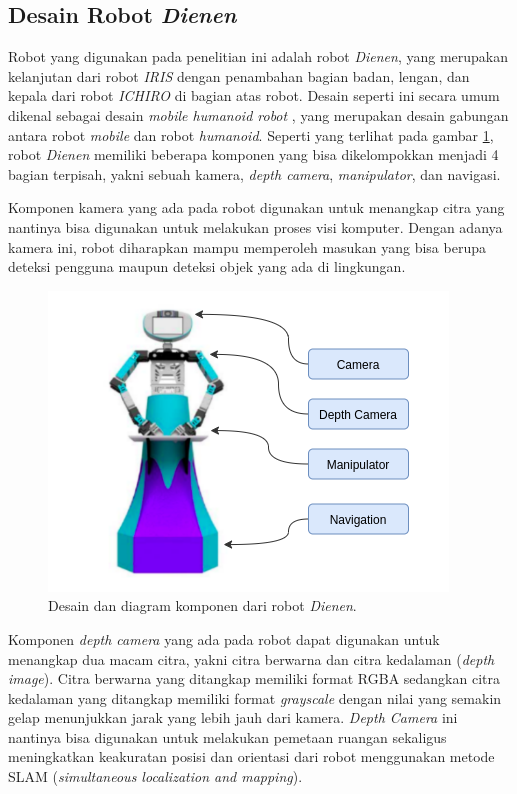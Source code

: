 \subsection{Desain Robot \emph{Dienen}}
\label{subsec:desainrobotdienen}

Robot yang digunakan pada penelitian ini adalah robot \emph{Dienen},
  yang merupakan kelanjutan dari robot \emph{IRIS} \citep{cit:dikairono2020}\citep{cit:zanuar2019} dengan penambahan bagian badan, lengan, dan kepala dari robot \emph{ICHIRO} \citep{cit:muhtadin2019} di bagian atas robot.
Desain seperti ini secara umum dikenal sebagai desain \emph{mobile humanoid robot} \citep{cit:mohamed2012}, yang merupakan desain gabungan antara robot \emph{mobile} dan robot \emph{humanoid}.
Seperti yang terlihat pada gambar \ref{fig:komponenrobot},
  robot \emph{Dienen} memiliki beberapa komponen yang bisa dikelompokkan menjadi 4 bagian terpisah, yakni sebuah kamera, \emph{depth camera}, \emph{manipulator}, dan navigasi.

Komponen kamera yang ada pada robot digunakan untuk menangkap citra yang nantinya bisa digunakan untuk melakukan proses visi komputer.
Dengan adanya kamera ini, robot diharapkan mampu memperoleh masukan yang bisa berupa deteksi pengguna maupun deteksi objek yang ada di lingkungan.

\begin{figure}[ht]
  \centering
  \includegraphics[scale=0.5]{gambar/komponen-robot.png}
  \caption{Desain dan diagram komponen dari robot \emph{Dienen}.}
  \label{fig:komponenrobot}
\end{figure}

Komponen \emph{depth camera} yang ada pada robot dapat digunakan untuk menangkap dua macam citra,
  yakni citra berwarna dan citra kedalaman (\emph{depth image}).
Citra berwarna yang ditangkap memiliki format RGBA sedangkan citra kedalaman yang ditangkap memiliki format \emph{grayscale} dengan nilai yang semakin gelap menunjukkan jarak yang lebih jauh dari kamera.
\emph{Depth Camera} ini nantinya bisa digunakan untuk melakukan pemetaan ruangan sekaligus meningkatkan keakuratan posisi dan orientasi dari robot menggunakan metode SLAM (\emph{simultaneous localization and mapping}).

